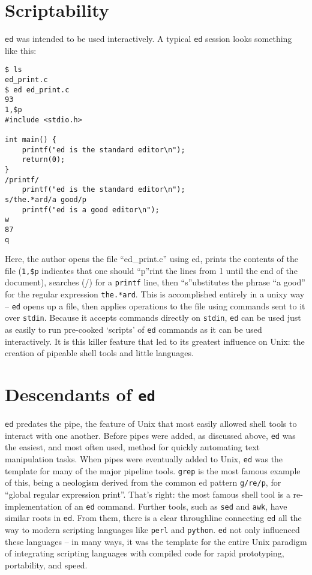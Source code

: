 \documentclass[12pt]{article}
\begin{document}
\section{Scriptability}

\lstinline{ed} was intended to be used interactively. A typical \lstinline{ed}
session looks something like this:

\begin{lstlisting}
$ ls
ed_print.c
$ ed ed_print.c
93
1,$p
#include <stdio.h>

int main() {
    printf("ed is the standard editor\n");
    return(0);
}
/printf/
    printf("ed is the standard editor\n");
s/the.*ard/a good/p
    printf("ed is a good editor\n");
w
87
q
\end{lstlisting}

Here, the author opens the file ``ed\_print.c'' using ed,
prints the contents of the file (\lstinline{1,$p} indicates
that one should ``p''rint the lines from 1 until the end of the document),
searches (/) for a \lstinline{printf} line,
then ``s''ubstitutes the phrase ``a good'' for the regular
expression \lstinline{the.*ard}.
This is accomplished entirely in a unixy way -- \lstinline{ed} opens
up a file, then applies operations to the file using commands
sent to it over \lstinline{stdin}. Because it accepts commands
directly on \lstinline{stdin}, \lstinline{ed} can be used just
as easily to run pre-cooked `scripts' of \lstinline{ed} commands
as it can be used interactively. It is this killer feature that
led to its greatest influence on Unix: the creation of pipeable
shell tools and little languages.

\section{Descendants of \lstinline{ed}}

\lstinline{ed} predates the pipe, the feature of Unix that most easily allowed shell
tools to interact with one another.
Before pipes were added, as discussed above, \lstinline{ed} was the easiest, and most
often used, method for quickly automating text manipulation tasks.
When pipes were eventually added to Unix, \lstinline{ed} was the template for many
of the major pipeline tools.
\lstinline{grep} is the most famous example of this, being a neologism derived
from the common ed pattern \lstinline{g/re/p}, for ``global regular expression print''.
That's right: the most famous shell tool is a re-implementation of an \lstinline{ed}
command. Further tools, such as \lstinline{sed} and \lstinline{awk}, have similar
roots in \lstinline{ed}. From them, there is a clear throughline connecting
\lstinline{ed} all the way to modern scripting languages like \lstinline{perl} and
\lstinline{python}. \lstinline{ed} not only influenced these languages -- in many
ways, it was the template for the entire Unix paradigm of integrating scripting languages
with compiled code for rapid prototyping, portability, and speed.
\end{document}
